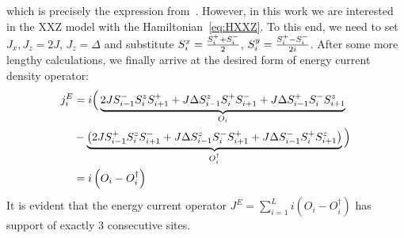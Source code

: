 which is precisely the expression from~\textcite{Zotos1997}. 
However, in this work we are interested in the XXZ model with the Hamiltonian~\eqref{eq:HXXZ}. To this end,
we need to set \(J_x, J_z = 2J\), \(J_z = \Delta\) and substitute \(S^{x}_i = \frac{S^{+}_i + S^{-}_i}{2}\), \(S^{y}_i = \frac{S^{+}_i-S^{-}_i}{2i}\).
After some more lengthy calculations, we finally arrive at the desired form of energy current density operator:
\begin{align}
    j_i^E &= i \Big( \underbrace{2J S^{-}_{i-1}S^{z}_i S^{+}_{i+1} + J \Delta S^{z}_{i-1}S^{+}_i S^{-}_{i+1} + J\Delta S^{+}_{i-1}S^{-}_iS^{z}_{i+1}}_{O_i} \\
    &- \underbrace{\left(2J S^{+}_{i-1}S^{z}_i S^{-}_{i+1} + J\Delta S^{z}_{i-1}S^{-}_i S^{+}_{i+1} + J\Delta S^{-}_{i-1}S^{+}_{i} S^{z}_{i+1} \right)}_{O_i^{\dagger}}\Big) \nonumber \\
    &= i\left(O_i - O_i^{\dagger}\right)
    \label{eq:final energy current density}
\end{align}
It is evident that the energy current operator \(J^E = \sum_{i=1}^L i \left(O_i - O_i^{\dagger}\right) \) has support of exactly \(3\) consecutive sites.

